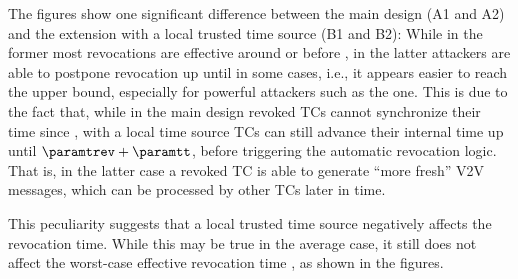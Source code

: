 The figures show one significant difference between the main design (A1 and A2)
and the extension with a local trusted time source (B1 and B2): While in the
former most revocations are effective around or before \paramtt{}, in the latter
attackers are able to postpone revocation up until \paramteff{} in some cases,
i.e., it appears easier to reach the upper bound, especially for powerful
attackers such as the \attackersmart{} one. This is due to the fact that, while
in the main design revoked \acp{TC} cannot synchronize their time since
\paramtrev, with a local time source \acp{TC} can still advance their internal
time up until $\paramtrev + \paramtt$, before triggering the automatic
revocation logic. That is, in the latter case a revoked \ac{TC} is able to
generate ``more fresh'' \ac{V2V} messages, which can be processed by other
\acp{TC} later in time.

This peculiarity suggests that a local trusted time source negatively affects
the revocation time. While this may be true in the average case, it still does
not affect the worst-case effective revocation time \paramteff, as shown in the
figures.